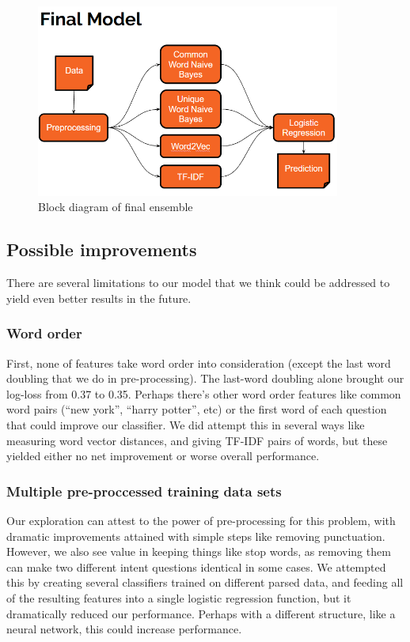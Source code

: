 \documentclass{article}
\begin{document}
\begin{figure}[h]
    \centering
    \mbox{\includegraphics[width=100mm]{block_diagram.png}}
    \caption{Block diagram of final ensemble}
\end{figure}

\subsection{Possible improvements}
There are several limitations to our model that we think could be addressed to
yield even better results in the future.

\subsubsection{Word order} First, none of features take word order into
consideration (except the last word doubling that we do in pre-processing). The
last-word doubling alone brought our log-loss from 0.37 to 0.35. Perhaps there’s
other word order features like common word pairs (“new york”, “harry potter”,
etc) or the first word of each question that could improve our classifier. We
did attempt this in several ways like measuring word vector distances, and
giving TF-IDF pairs of words, but these yielded either no net improvement or
worse overall performance.

\subsubsection{Multiple pre-proccessed training data sets}

Our exploration can attest to the power of pre-processing for this problem, with
dramatic improvements attained with simple steps like removing punctuation.
However, we also see value in keeping things like stop words, as removing them
can make two different intent questions identical in some cases. We attempted
this by creating several classifiers trained on different parsed data, and
feeding all of the resulting features into a single logistic regression
function, but it dramatically reduced our performance. Perhaps with a different
structure, like a neural network, this could increase performance.
\end{document}
